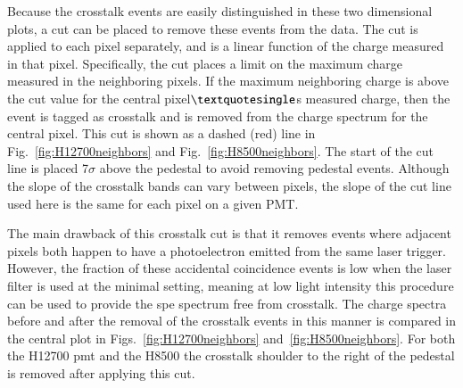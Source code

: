 Because the crosstalk events are easily distinguished in these two dimensional plots, a cut can be placed to remove these events from the data. The cut is applied to each pixel separately, and is a linear function of the charge measured in that pixel. Specifically, the cut places a limit on the maximum charge measured in the neighboring pixels. If the maximum neighboring charge is above the cut value for the central pixel$\textquotesingle$s measured charge, then the event is tagged as crosstalk and is removed from the charge spectrum for the central pixel. This cut is shown as a dashed (red) line in Fig.~\ref{fig:H12700neighbors} and Fig.~\ref{fig:H8500neighbors}. The start of the cut line is placed 7$\sigma$ above the pedestal to avoid removing pedestal events. Although the slope of the crosstalk bands can vary between pixels, the slope of the cut line used here is the same for each pixel on a given PMT. 

The main drawback of this crosstalk cut is that it removes events where adjacent pixels both happen to have a photoelectron emitted from the same laser trigger. However, the fraction of these accidental coincidence events is low when the laser filter is used at the minimal setting, meaning at low light intensity this procedure can be used to provide the spe spectrum free from crosstalk. The charge spectra before and after the removal of the crosstalk events in this manner is compared in the central plot in Figs.~\ref{fig:H12700neighbors} and~\ref{fig:H8500neighbors}. For both the H12700 pmt and the H8500 the crosstalk shoulder to the right of the pedestal is removed after applying this cut. 
